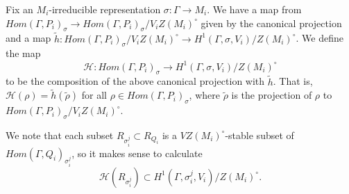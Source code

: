 Fix an $M_i$-irreducible representation $\sigma: \Gamma \rightarrow M_i$. We have a map from $Hom(\Gamma, P_i)_\sigma \rightarrow Hom(\Gamma, P_i)_\sigma / V_i Z(M_i)^\circ$ given by the canonical projection and a map $\tilde{h}: Hom(\Gamma, P_i)_\sigma / V_i Z(M_i)^\circ \rightarrow H^1(\Gamma, \sigma, V_i)/Z(M_i)^\circ$. We define the map
\begin{displaymath}
  \mathcal{H}: Hom(\Gamma, P_i)_\sigma \rightarrow H^1(\Gamma, \sigma, V_i) / Z(M_i)^\circ
\end{displaymath}
to be the composition of the above canonical projection with $\tilde{h}$. That is, $\mathcal{H}(\rho) = \tilde{h}(\tilde{\rho})$ for all $\rho \in Hom(\Gamma, P_i)_\sigma$, where $\tilde{\rho}$ is the projection of $\rho$ to $Hom(\Gamma, P_i)_\sigma / V_i Z(M_i)^\circ$.

We note that each subset $R_{\sigma_i^j} \subset R_{Q_i}$ is a $VZ(M_i)^\circ$-stable subset of $Hom(\Gamma, Q_i)_{\sigma_i^j}$, so it makes sense to calculate
\begin{displaymath}
  \mathcal{H}(R_{\sigma_i^j}) \subset H^1(\Gamma, \sigma_i^j, V_i) / Z(M_i)^\circ.
\end{displaymath}

